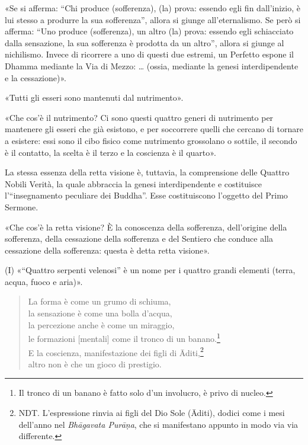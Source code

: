 

«Se si afferma: “Chi produce (sofferenza), (la) prova: essendo egli fin
dall’inizio, è lui stesso a produrre la sua sofferenza”, allora si
giunge all’eternalismo. Se però si afferma: “Uno produce (sofferenza),
un altro (la) prova: essendo egli schiacciato dalla sensazione, la sua
sofferenza è prodotta da un altro”, allora si giunge al nichilismo.
Invece di ricorrere a uno di questi due estremi, un Perfetto espone il
Dhamma mediante la Via di Mezzo: … (ossia, mediante la genesi
interdipendente e la cessazione)».




«Tutti gli esseri sono mantenuti dal nutrimento».




«Che cos’è il nutrimento? Ci sono questi quattro generi di nutrimento
per mantenere gli esseri che già esistono, e per soccorrere quelli che
cercano di tornare a esistere: essi sono il cibo fisico come nutrimento
grossolano o sottile, il secondo è il contatto, la scelta è il terzo e
la coscienza è il quarto».




 La stessa essenza della retta visione è, tuttavia, la
comprensione delle Quattro Nobili Verità, la quale abbraccia la genesi
interdipendente e costituisce l’“insegnamento peculiare dei Buddha”.
Esse costituiscono l’oggetto del Primo Sermone.


 «Che cos’è la retta visione? È la conoscenza della
sofferenza, dell’origine della sofferenza, della cessazione della
sofferenza e del Sentiero che conduce alla cessazione della sofferenza:
questa è detta retta visione».




(I) «“Quattro serpenti velenosi” è un nome per i quattro grandi
elementi (terra, acqua, fuoco e aria)».




\begin{quote}
La forma è come un grumo di schiuma, \\
la sensazione è come una bolla d’acqua, \\
la percezione anche è come un miraggio, \\
le formazioni [mentali] come il tronco di un banano.\footnote{Il tronco di un banano è fatto solo d’un involucro, è privo di nucleo.} \\
E la coscienza, manifestazione dei figli di Āditi,\footnote{NDT. L’espressione rinvia ai figli del Dio Sole (Āditi), dodici come i mesi dell’anno nel \emph{Bhāgavata Purāṇa}, che si manifestano appunto in modo via via differente.} \\
altro non è che un gioco di prestigio.
\end{quote}


